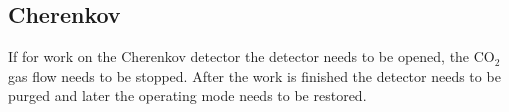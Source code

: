 \begin{safetyen}{0}{0}
\subsection{Cherenkov}

If for work on the Cherenkov detector the detector needs to be opened, 
the CO$_2$ gas flow needs to be stopped. After the work is finished the 
detector needs to be purged and later the operating mode needs to be restored.

\end{safetyen}



%
%
%
%
%
%
